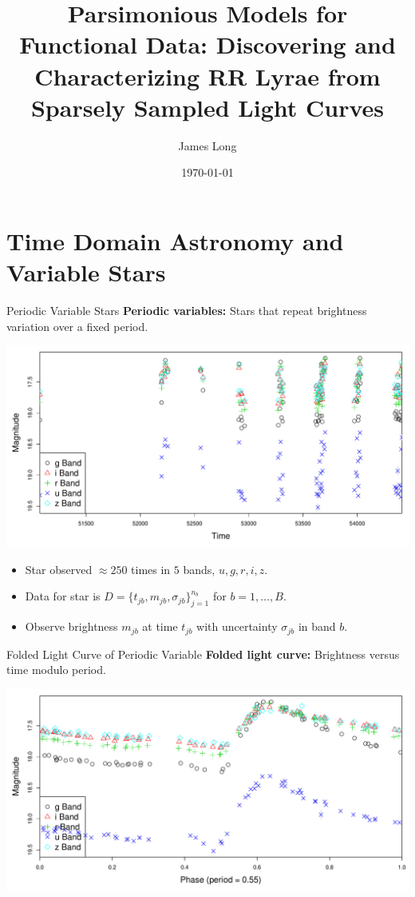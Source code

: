 \documentclass[12pt]{beamer}
\title{Parsimonious Models for Functional Data: Discovering and Characterizing RR Lyrae from Sparsely Sampled Light Curves}
\author{James Long}
\date{\today}
\begin{document}
\frame{\titlepage}

\frame{\tableofcontents}





\section{Time Domain Astronomy and Variable Stars}

\begin{frame}{Periodic Variable Stars}
\textbf{Periodic variables:} Stars that repeat brightness variation over a fixed period.
\begin{center}
\includegraphics[scale=.3]{figs/unfolded_13350.pdf}
\end{center}
\begin{itemize}
\item Star observed $\approx 250$ times in $5$ bands, $u,g,r,i,z$.
\item Data for star is $D=\{t_{jb},m_{jb},\sigma_{jb}\}_{j=1}^{n_b}$ for $b=1,\ldots,B$.
\item Observe brightness $m_{jb}$ at time $t_{jb}$ with uncertainty $\sigma_{jb}$ in band $b$.
\end{itemize}
\end{frame}


\begin{frame}{Folded Light Curve of Periodic Variable}
\textbf{Folded light curve:} Brightness versus time modulo period.
\begin{center}
\includegraphics[scale=.3]{figs/folded_13350.pdf}
\end{center}
\end{frame}
\end{document}
